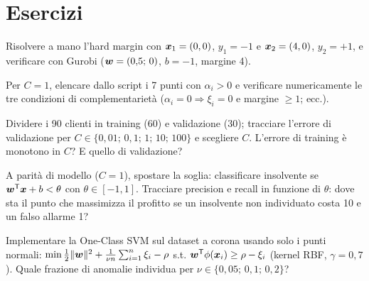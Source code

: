 \begin{center}
\end{center}

\section{Esercizi}

\begin{esercizio}[verifica]
Risolvere a mano l'hard margin con $\boldsymbol{x}_1 = (0,0)$, $y_1 = -1$ e $\boldsymbol{x}_2 = (4,0)$,
$y_2 = +1$, e verificare con Gurobi ($\boldsymbol{w} = (0{,}5;\, 0)$, $b = -1$, margine 4).
\end{esercizio}

\begin{esercizio}[complementarietà]
Per $C = 1$, elencare dallo script i 7 punti con $\alpha_i > 0$ e verificare
numericamente le tre condizioni di complementarietà
($\alpha_i = 0 \Rightarrow \xi_i = 0$ e margine $\ge 1$; ecc.).
\end{esercizio}

\begin{esercizio}
Dividere i 90 clienti in training (60) e validazione (30); tracciare l'errore di
validazione per $C \in \{0{,}01;\, 0{,}1;\, 1;\, 10;\, 100\}$ e scegliere $C$.
L'errore di training è monotono in $C$? E quello di validazione?
\end{esercizio}

\begin{esercizio}
A parità di modello ($C = 1$), spostare la soglia: classificare insolvente se
$\boldsymbol{w}^{\mathsf T} \boldsymbol{x} + b < \theta$ con $\theta \in [-1, 1]$. Tracciare precision e recall in
funzione di $\theta$: dove sta il punto che massimizza il profitto se un insolvente
non individuato costa 10 e un falso allarme 1?
\end{esercizio}

\begin{esercizio}
Implementare la One-Class SVM sul dataset a corona usando solo i punti normali:
$\min \tfrac12\|\boldsymbol{w}\|^2 + \tfrac{1}{\nu n}\sum_{i=1}^{n} \xi_i - \rho$ s.t.
$\boldsymbol{w}^{\mathsf T}\phi(\boldsymbol{x}_i) \ge \rho - \xi_i$ (kernel RBF, $\gamma = 0{,}7$). Quale frazione di
anomalie individua per $\nu \in \{0{,}05;\, 0{,}1;\, 0{,}2\}$?
\end{esercizio}
